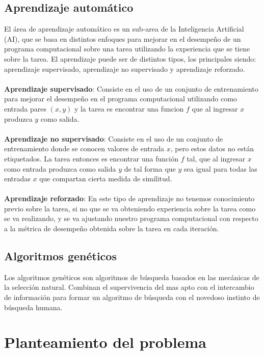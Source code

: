 \subsection{Aprendizaje automático}

El área de aprendizaje automático es un sub-area de la Inteligencia Artificial (AI), que se basa en distintos enfoques para mejorar en el desempeño de un programa computacional sobre una tarea utilizando la experiencia que se tiene sobre la tarea. El aprendizaje puede ser de distintos tipos, los principales siendo: aprendizaje supervisado, aprendizaje no supervisado y aprendizaje reforzado.
\\
\\
\textbf{Aprendizaje supervisado}: Consiste en el uso de un conjunto de entrenamiento para mejorar el desempeño en el programa computacional utilizando como entrada pares $(x,y)$ y la tarea es encontrar una funcion $f$ que al ingresar $x$ produzca $y$ como salida. 
\\
\\
\textbf{Aprendizaje no supervisado}: Consiste en el uso de un conjunto de entrenamiento donde se conocen valores de entrada $x$, pero estos datos no están etiquetados. La tarea entonces es encontrar una función $f$ tal, que al ingresar $x$ como entrada produzca como salida $y$ de tal forma que $y$ sea igual para todas las entradas $x$ que compartan cierta medida de similitud.
\\
\\
\textbf{Aprendizaje reforzado}: En este tipo de aprendizaje no tenemos conocimiento previo sobre la tarea, si no que se va obteniendo experiencia sobre la tarea como se va realizando, y se va ajustando nuestro programa computacional con respecto a la métrica de desempeño obtenida sobre la tarea en cada iteración.

\subsection{Algoritmos genéticos}

Los algoritmos genéticos son algoritmos de búsqueda basados en las mecánicas de la selección natural. Combinan el supervivencia del mas apto con el intercambio de información para formar un algoritmo de búsqueda con el novedoso instinto de búsqueda humana.  


\section{Planteamiento del problema}

